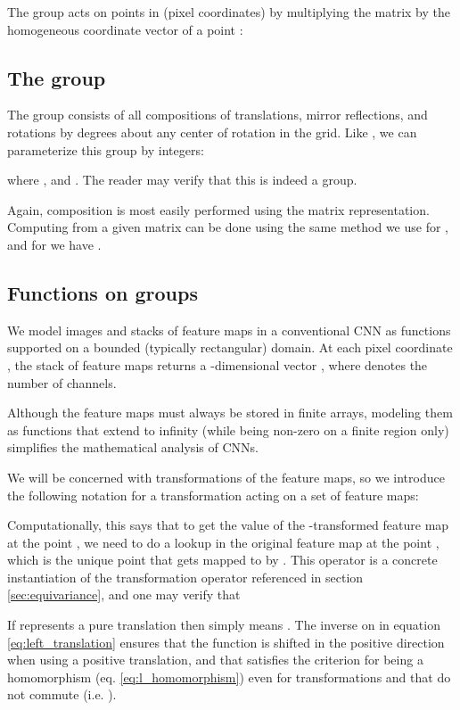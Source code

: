 \documentclass{article}
\begin{document}
The group  acts on points in  (pixel coordinates) by multiplying the matrix  by the homogeneous coordinate vector  of a point :



\subsection{The group }
\label{sec:group_p4m}

The group  consists of all compositions of translations, mirror reflections, and rotations by  degrees about any center of rotation in the grid.
Like , we can parameterize this group by integers:

where ,  and .
The reader may verify that this is indeed a group.

Again, composition is most easily performed using the matrix representation.
Computing  from a given matrix  can be done using the same method we use for , and for  we have .


\subsection{Functions on groups}
\label{sec:feature_maps}

We model images and stacks of feature maps in a conventional CNN as functions  supported on a bounded (typically rectangular) domain.
At each pixel coordinate , the stack of feature maps returns a -dimensional vector , where  denotes the number of channels.

Although the feature maps must always be stored in finite arrays, modeling them as functions that extend to infinity (while being non-zero on a finite region only) simplifies the mathematical analysis of CNNs.

We will be concerned with transformations of the feature maps, so we introduce the following notation for a transformation  acting on a set of feature maps:

Computationally, this says that to get the value of the -transformed feature map  at the point , we need to do a lookup in the original feature map  at the point , which is the unique point that gets mapped to  by .
This operator  is a concrete instantiation of the transformation operator  referenced in section \ref{sec:equivariance}, and one may verify that


If  represents a pure translation  then  simply means .
The inverse on  in equation \ref{eq:left_translation} ensures that the function is shifted in the positive direction when using a positive translation, and that  satisfies the criterion for being a homomorphism (eq. \ref{eq:l_homomorphism}) even for transformations  and  that do not commute (i.e. ).
\end{document}
